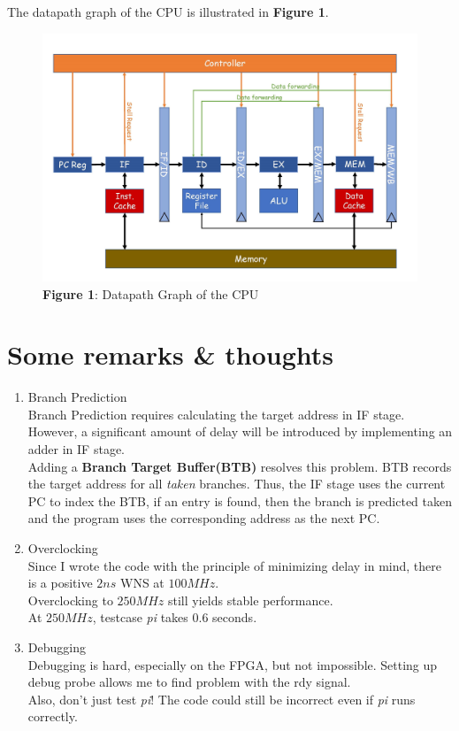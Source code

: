 \documentclass[UTF8, 12pt]{ctexart}
\begin{document}
            The datapath graph of the CPU is illustrated in \textbf{Figure 1}.
            \begin{figure}[h]
                \includegraphics[scale=0.4]{datapath_diagram_2.jpg}
                \centering
                \caption*{\textbf{Figure 1}: Datapath Graph of the CPU}
            \end{figure}
        \section{Some remarks \& thoughts}
        \begin{enumerate}[label=(\arabic*)]
            \item Branch Prediction \\
                Branch Prediction requires calculating the target address in IF stage. However, a significant amount of delay will be introduced by implementing an adder in IF stage.\\
                Adding a \textbf{Branch Target Buffer(BTB)} resolves this problem. BTB records the target address for all \textit{taken} branches. Thus, the IF stage uses the current PC to index the BTB,
                if an entry is found, then the branch is predicted taken and the program uses the corresponding address as the next PC. 
            \item Overclocking \\
                Since I wrote the code with the principle of minimizing delay in mind, there is a positive $2ns$ WNS at $100MHz$. \\
                Overclocking to $250MHz$ still yields stable performance. \\
                At $250MHz$, testcase \textit{pi} takes $0.6$ seconds.
            \item Debugging \\
                Debugging is hard, especially on the FPGA, but not impossible. Setting up debug probe allows me to find problem with the rdy signal. \\
                Also, don't just test \textit{pi}! The code could still be incorrect even if \textit{pi} runs correctly. 
        \end{enumerate}
\end{document}
